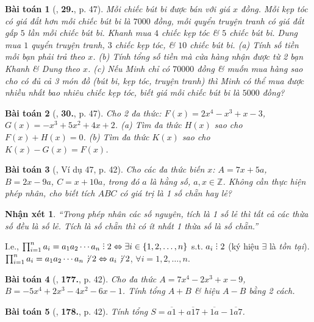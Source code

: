 \documentclass{article}
\numberwithin{equation}{section}
\newtheorem{baitoan}{Bài toán}
\newtheorem{nhanxet}{Nhận xét}[section]
\DeclareRobustCommand{\divby}{%
	\mathrel{\vbox{\baselineskip.65ex\lineskiplimit0pt\hbox{.}\hbox{.}\hbox{.}}}%
}
\begin{document}
\begin{baitoan}[\cite{SBT_Toan_7_Canh_Dieu_tap_2}, \textbf{29.}, p. 47]
	Mỗi chiếc bút bi được bán với giá $x$ đồng. Mỗi kẹp tóc có giá đắt hơn mỗi chiếc bút bi là $7000$ đồng, mỗi quyển truyện tranh có giá đắt gấp $5$ lần mỗi chiếc bút bi. Khanh mua $4$ chiếc kẹp tóc \& $5$ chiếc bút bi. Dung mua $1$ quyển truyện tranh, $3$ chiếc kẹp tóc, \& $10$ chiếc bút bi. (a) Tính số tiền mỗi bạn phải trả theo $x$. (b) Tính tổng số tiền mà cửa hàng nhận được từ 2 bạn Khanh \& Dung theo $x$. (c) Nếu Minh chỉ có $70000$ đồng \& muốn mua hàng sao cho có đủ cả 3 món đồ (bút bi, kẹp tóc, truyện tranh) thì Minh có thể mua được nhiều nhất bao nhiêu chiếc kẹp tóc, biết giá mỗi chiếc bút bi là $5000$ đồng?
\end{baitoan}

\begin{baitoan}[\cite{SBT_Toan_7_Canh_Dieu_tap_2}, \textbf{30.}, p. 47]
	Cho 2 đa thức: $F(x) = 2x^4 - x^3 + x - 3$, $G(x) = -x^3 + 5x^2 + 4x + 2$. (a) Tìm đa thức $H(x)$ sao cho $F(x) + H(x) = 0$. (b) Tìm đa thức $K(x)$ sao cho $K(x) - G(x) = F(x)$.
\end{baitoan}

\begin{baitoan}[\cite{Tuyen_Toan_7}, Ví dụ 47, p. 42]
	Cho các đa thức biến $x$: $A = 7x + 5a$, $B = 2x - 9a$, $C = x + 10a$, trong đó $a$ là hằng số, $a,x\in\mathbb{Z}$. Không cần thực hiện phép nhân, cho biết tích $ABC$ có giá trị là 1 số chẵn hay lẻ?
\end{baitoan}

\begin{nhanxet}
	``Trong phép nhân các số nguyên, tích là 1 số lẻ thì tất cả các thừa số đều là số lẻ. Tích là số chẵn thì có ít nhất 1 thừa số là số chẵn.''
\end{nhanxet}
I.e., $\prod_{i=1}^n a_i = a_1a_2\cdots a_n\divby2\Leftrightarrow\exists i\in\{1,2,\ldots,n\}$ s.t. $a_i\divby2$ (ký hiệu $\exists$ là \textit{tồn tại}). $\prod_{i=1}^n a_i = a_1a_2\cdots a_n\not\,\divby2\Leftrightarrow a_i\not\,\divby2$, $\forall i = 1,2,\ldots,n$.

\begin{baitoan}[\cite{Tuyen_Toan_7}, \textbf{177.}, p. 42]
	Cho đa thức $A = 7x^4 - 2x^3 + x - 9$, $B = -5x^4 + 2x^3 - 4x^2 - 6x - 1$. Tính tổng $A + B$ \& hiệu $A - B$ bằng 2 cách.
\end{baitoan}

\begin{baitoan}[\cite{Tuyen_Toan_7}, \textbf{178.}, p. 42]
	Tính tổng $S = \overline{a1} + \overline{a17} + \overline{1a} - \overline{1a7}$.
\end{baitoan}
\end{document}

